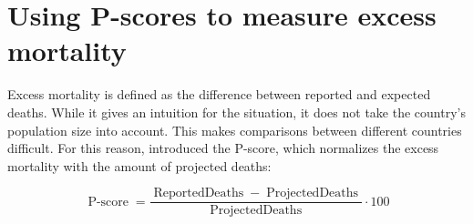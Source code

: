 \documentclass{article}
\begin{document}


\section{Using P-scores to measure excess mortality}

Excess mortality is defined as the difference between reported and expected deaths. While it gives an intuition for the situation, it does not take the country's population size into account. This makes comparisons between different countries difficult. For this reason, \citet{owid_20} introduced the P-score, which normalizes the excess mortality with the amount of projected deaths:

\begin{equation}
	\operatorname{P-score} = \frac{\operatorname{Reported Deaths} - \operatorname{Projected Deaths}}{\operatorname{Projected Deaths}} \cdot 100
\end{equation}
\end{document}

